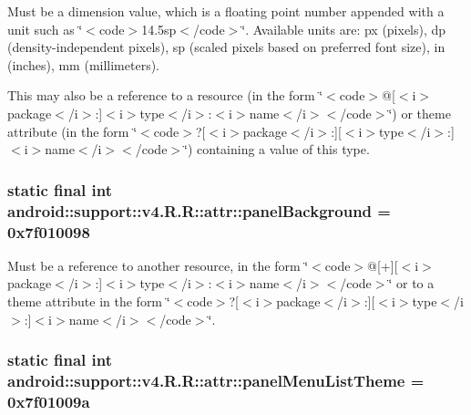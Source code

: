 Must be a dimension value, which is a floating point number appended with a unit such as \char`\"{}$<$code$>$14.5sp$<$/code$>$\char`\"{}. Available units are: px (pixels), dp (density-independent pixels), sp (scaled pixels based on preferred font size), in (inches), mm (millimeters). 

This may also be a reference to a resource (in the form \char`\"{}$<$code$>$@\mbox{[}$<$i$>$package$<$/i$>$:\mbox{]}$<$i$>$type$<$/i$>$:$<$i$>$name$<$/i$>$$<$/code$>$\char`\"{}) or theme attribute (in the form \char`\"{}$<$code$>$?\mbox{[}$<$i$>$package$<$/i$>$:\mbox{]}\mbox{[}$<$i$>$type$<$/i$>$:\mbox{]}$<$i$>$name$<$/i$>$$<$/code$>$\char`\"{}) containing a value of this type. \hypertarget{classandroid_1_1support_1_1v4_1_1_r_1_1attr_ccdc6a4b0b6d4912e1f84d025cb1f450}{
\subsubsection[{panelBackground}]{\setlength{\rightskip}{0pt plus 5cm}static final int android::support::v4.R.R::attr::panelBackground = 0x7f010098}}
\label{classandroid_1_1support_1_1v4_1_1_r_1_1attr_ccdc6a4b0b6d4912e1f84d025cb1f450}


Must be a reference to another resource, in the form \char`\"{}$<$code$>$@\mbox{[}+\mbox{]}\mbox{[}$<$i$>$package$<$/i$>$:\mbox{]}$<$i$>$type$<$/i$>$:$<$i$>$name$<$/i$>$$<$/code$>$\char`\"{} or to a theme attribute in the form \char`\"{}$<$code$>$?\mbox{[}$<$i$>$package$<$/i$>$:\mbox{]}\mbox{[}$<$i$>$type$<$/i$>$:\mbox{]}$<$i$>$name$<$/i$>$$<$/code$>$\char`\"{}. \hypertarget{classandroid_1_1support_1_1v4_1_1_r_1_1attr_73678d8d69d425cc5e4e655ba72bb96a}{
\subsubsection[{panelMenuListTheme}]{\setlength{\rightskip}{0pt plus 5cm}static final int android::support::v4.R.R::attr::panelMenuListTheme = 0x7f01009a}}
\label{classandroid_1_1support_1_1v4_1_1_r_1_1attr_73678d8d69d425cc5e4e655ba72bb96a}


